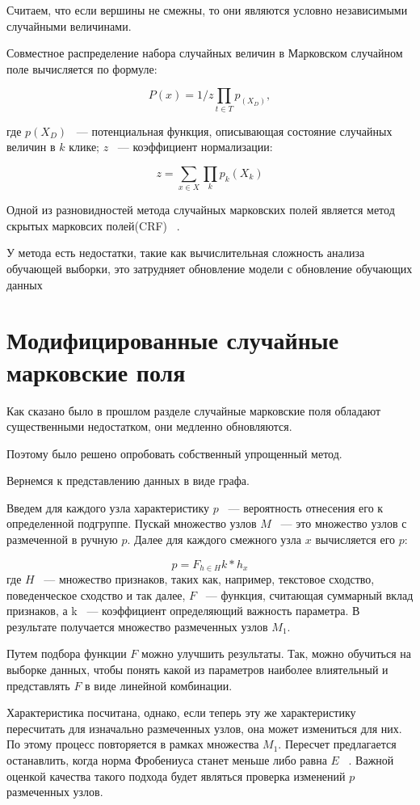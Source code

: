 \documentclass[annotation,times,page4]{itmo-student-thesis}
\begin{document}
Считаем, что если вершины не смежны, то они являются условно независимыми случайными величинами.

Совместное распределение набора случайных величин в Марковском случайном поле вычисляется по формуле:

\[
    P(x) = 1/z\prod_{t \in T} p_(X_{D}),
\]

где $p (X_{D})$ ~--- потенциальная функция, описывающая состояние случайных величин в $k$ клике; $z$ ~--- коэффициент нормализации:

\[
    z = \sum_{x \in X}\prod_{k} p_{k} (X_{k})
\]

Одной из разновидностей метода случайных марковских полей является метод скрытых марковсих полей(CRF) ~\cite{lafferty2001conditional, antongondon2013}.

У метода есть недостатки, такие как вычислительная сложность анализа обучающей выборки, это затрудняет обновление модели с обновление обучающих данных 
\section{Модифицированные случайные марковские поля}
Как сказано было в прошлом разделе случайные марковские поля обладают существенными недостатком, они медленно обновляются.

Поэтому было решено опробовать собственный упрощенный метод.

Вернемся к представлению данных в виде графа. 

Введем для каждого узла характеристику $p$ ~--- вероятность отнесения его к определенной подгруппе. Пускай множество узлов $M$ ~--- это множество узлов с размеченной в ручную $p$. Далее для каждого смежного узла $x$ вычисляется его $p$: 

\[
    p = F_{h \in H}k*h_{x}
\] 
где $H$ ~--- множество признаков, таких как, например, текстовое сходство, поведенческое сходство и так далее, $F$ ~--- функция, считающая суммарный вклад признаков, а k ~--- коэффициент определяющий важность параметра. В результате получается множество размеченных узлов $M_{1}$.

Путем подбора функции $F$ можно улучшить результаты. Так, можно обучиться на выборке данных, чтобы понять какой из параметров наиболее влиятельный и представлять $F$ в виде линейной комбинации.

Характеристика посчитана, однако, если теперь эту же характеристику пересчитать для изначально размеченных узлов, она может измениться для них. По этому процесс повторяется в рамках множества $M_{1}$. Пересчет предлагается останавлить, когда норма Фробениуса станет меньше либо равна $E$ ~\cite{lankaster1978}. Важной оценкой качества такого подхода будет являться проверка изменений $p$ размеченных узлов. 
\end{document}

